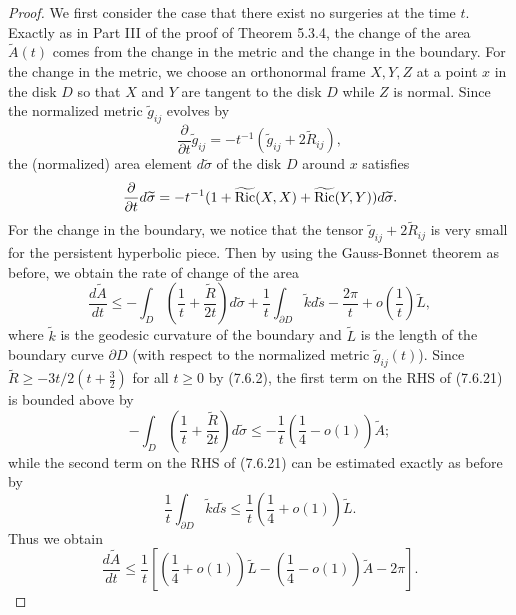 \begin{proof}
We first consider the case that there exist no surgeries at the
time $t$. Exactly as in Part III of the proof of Theorem 5.3.4,
the change of the area $\widetilde{A}(t)$ comes from the change in
the metric and the change in the boundary. For the change in the
metric, we choose an orthonormal frame $X,Y,Z$ at a point $x$ in
the disk $D$ so that $X$ and $Y$ are tangent to the disk $D$ while
$Z$ is normal. Since the normalized metric $\widetilde{g}_{ij}$
evolves by
$$
\frac{\partial}{\partial t}\widetilde{g}_{ij}
=-t^{-1}(\widetilde{g}_{ij}+2\widetilde{R}_{ij}),
$$
the (normalized) area element $d\widetilde{\sigma}$ of the disk
$D$ around $x$ satisfies
$$\frac{\partial}{\partial t}d\widetilde{\sigma}
=-t^{-1}(1+\widetilde{\operatorname{Ric}}(X,X)+\widetilde{\operatorname{Ric}}(Y,Y))
d\widetilde{\sigma}.
$$
For the change in the boundary, we notice that the tensor
$\widetilde{g}_{ij}+2\widetilde{R}_{ij}$ is very small for the
persistent hyperbolic piece. Then by using the Gauss-Bonnet
theorem as before, we obtain the rate of change of the area \begin{equation}
\frac{d\widetilde{A}}{dt}\leq
-\int_D\left(\frac{1}{t}+\frac{\widetilde{R}}{2t}\right)
d\widetilde{\sigma}+\frac{1}{t}\int_{\partial
D}\widetilde{k}d\widetilde{s}-\frac{2\pi}{t}+
o\left(\frac{1}{t}\right)\widetilde{L}, %
\end{equation} where $\widetilde{k}$ is the geodesic curvature of the
boundary and $\widetilde{L}$ is the length of the boundary curve
$\partial D$ (with respect to the normalized metric
$\widetilde{g}_{ij}(t)$).  Since $\widetilde{R}\geq
-{3t}/{2(t+\frac{3}{2})}$ for all $t\geq 0$ by (7.6.2), the first
term on the RHS of (7.6.21) is bounded above by
$$
-\int_D\left(\frac{1}{t}+\frac{\widetilde{R}}{2t}\right)d\widetilde{\sigma}\leq
-\frac{1}{t}\left(\frac{1}{4}- o(1)\right)\widetilde{A};
$$
while the second term on the RHS of (7.6.21) can be estimated
exactly as before by
$$
\frac{1}{t}\int_{\partial D}\widetilde{k}d\widetilde{s}\leq
\frac{1}{t}\left(\frac{1}{4}+o(1)\right)\widetilde{L}.
$$
Thus we obtain \begin{equation} \frac{d\widetilde{A}}{dt}\leq
\frac{1}{t}\left[\left(\frac{1}{4}+o(1)\right)
\widetilde{L}-\left(\frac{1}{4}-o(1)\right)\widetilde{A}-2\pi\right].
\end{equation}


\end{proof}
